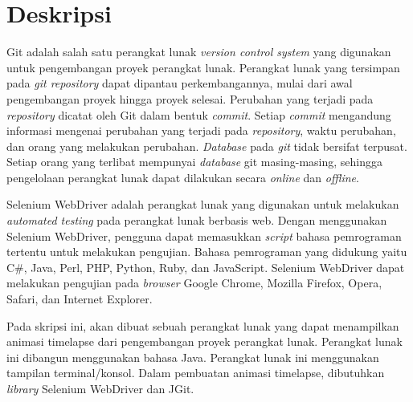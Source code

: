 \documentclass[a4paper,twoside]{article}
\begin{document}
\title{\@judultopik}
\author{\nama \textendash \@npm} 

\newcommand{\nama}{Billy Adiwijaya}
\newcommand{\@npm}{2015730053}
\newcommand{\@judultopik}{Pembangkit Timelapse Pengembangan Proyek Perangkat Lunak} %
\newcommand{\jumpemb}{1} %
\newcommand{\tanggal}{03/09/2018}


\maketitle


\section{Deskripsi}
 Git adalah salah satu perangkat lunak \textit{version control system} yang digunakan untuk pengembangan proyek perangkat lunak. Perangkat lunak yang tersimpan pada \textit{git repository} dapat dipantau perkembangannya, mulai dari awal pengembangan proyek hingga proyek selesai. Perubahan yang terjadi pada \textit{repository} dicatat oleh Git dalam bentuk \textit{commit}. Setiap \textit{commit} mengandung informasi mengenai perubahan yang terjadi pada \textit{repository}, waktu perubahan, dan orang yang melakukan perubahan. \textit{Database} pada \textit{git} tidak bersifat terpusat. Setiap orang yang terlibat mempunyai \textit{database} git masing-masing, sehingga pengelolaan perangkat lunak dapat dilakukan secara \textit{online} dan \textit{offline}. 

Selenium WebDriver adalah perangkat lunak yang digunakan untuk melakukan \textit{automated testing} pada perangkat lunak berbasis web. Dengan menggunakan Selenium WebDriver, pengguna dapat memasukkan \textit{script} bahasa pemrograman tertentu untuk melakukan pengujian. Bahasa pemrograman yang didukung yaitu C\#, Java, Perl, PHP, Python, Ruby, dan JavaScript. Selenium WebDriver dapat melakukan pengujian pada \textit{browser} Google Chrome, Mozilla Firefox, Opera, Safari, dan Internet Explorer.  
  
Pada skripsi ini, akan dibuat sebuah perangkat lunak yang dapat menampilkan animasi timelapse dari pengembangan proyek perangkat lunak. Perangkat lunak ini dibangun menggunakan bahasa Java. Perangkat lunak ini menggunakan tampilan terminal/konsol. Dalam pembuatan animasi timelapse, dibutuhkan \textit{library} Selenium WebDriver dan JGit. 
\end{document}
